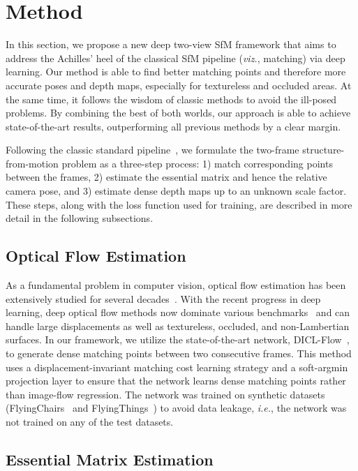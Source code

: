 \documentclass[final]{cvpr}
\def\ie{\emph{i.e.}}
\begin{document}
\section{Method}
\label{sec_method}
In this section, we propose a new deep two-view SfM framework that aims to address the Achilles' heel of the classical SfM pipeline (\emph{viz.}, matching) via deep learning. 
Our method is able to find better matching points and therefore more accurate poses and depth maps, especially for textureless and occluded areas. 
At the same time, it follows the wisdom of classic methods to avoid the ill-posed problems.
By combining the best of both worlds, our approach is able to achieve state-of-the-art results, outperforming all previous methods by a clear margin.

Following the classic standard pipeline~\cite{hartley2003multiple}, we formulate the two-frame structure-from-motion problem as a three-step process:  1) match corresponding points between the frames, 2) estimate the essential matrix and hence the relative camera pose, and 3) estimate dense depth maps up to an unknown scale factor.
These steps, along with the loss function used for training, are described in more detail in the following subsections.


\subsection{Optical Flow Estimation}

As a fundamental problem in computer vision, optical flow estimation has been extensively studied for several decades~\cite{horn1981determining}. 
With the recent progress in deep learning, deep optical flow methods now dominate various benchmarks~\cite{kittidataset,Butler2012Sintel} and can handle large displacements as well as textureless, occluded, and non-Lambertian surfaces. In our framework, we utilize the state-of-the-art network, DICL-Flow~\cite{zhong2020nipsflow}, to generate dense matching points between two consecutive frames. 
This method uses a displacement-invariant matching cost learning strategy and a soft-argmin projection layer to ensure that the network learns dense matching points rather than image-flow regression.
The network was trained on synthetic datasets (FlyingChairs~\cite{flyingchair} and FlyingThings~\cite{Mayer2016Things3D}) to avoid data leakage, \ie, the network was not trained on any of the test datasets.

\subsection{Essential Matrix Estimation}
\end{document}
